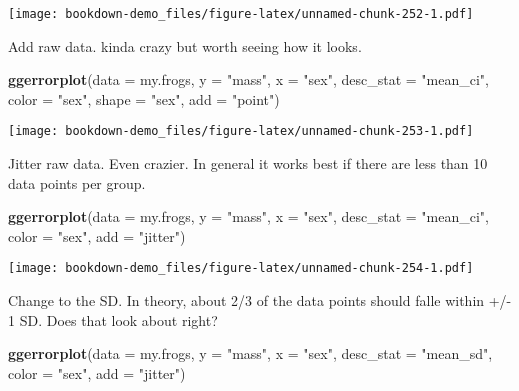 \documentclass[]{book}
\newenvironment{Shaded}{\begin{snugshade}}{\end{snugshade}}
\newcommand{\KeywordTok}[1]{\textcolor[rgb]{0.13,0.29,0.53}{\textbf{#1}}}
\newcommand{\DataTypeTok}[1]{\textcolor[rgb]{0.13,0.29,0.53}{#1}}
\newcommand{\StringTok}[1]{\textcolor[rgb]{0.31,0.60,0.02}{#1}}
\newcommand{\NormalTok}[1]{#1}
\theoremstyle{definition}
\theoremstyle{definition}
\theoremstyle{definition}
\theoremstyle{remark}
\begin{document}
\texttt{[image: bookdown-demo\_files/figure-latex/unnamed-chunk-252-1.pdf]}

Add raw data. kinda crazy but worth seeing how it looks.

\begin{Shaded}
\begin{Highlighting}[]
\KeywordTok{ggerrorplot}\NormalTok{(}\DataTypeTok{data =}\NormalTok{ my.frogs,}
          \DataTypeTok{y =} \StringTok{"mass"}\NormalTok{,}
          \DataTypeTok{x =} \StringTok{"sex"}\NormalTok{,}
          \DataTypeTok{desc_stat =} \StringTok{"mean_ci"}\NormalTok{,}
          \DataTypeTok{color =} \StringTok{"sex"}\NormalTok{,}
          \DataTypeTok{shape =} \StringTok{"sex"}\NormalTok{,}
          \DataTypeTok{add =} \StringTok{"point"}\NormalTok{)}
\end{Highlighting}
\end{Shaded}

\texttt{[image: bookdown-demo\_files/figure-latex/unnamed-chunk-253-1.pdf]}

Jitter raw data. Even crazier. In general it works best if there are
less than 10 data points per group.

\begin{Shaded}
\begin{Highlighting}[]
\KeywordTok{ggerrorplot}\NormalTok{(}\DataTypeTok{data =}\NormalTok{ my.frogs,}
          \DataTypeTok{y =} \StringTok{"mass"}\NormalTok{,}
          \DataTypeTok{x =} \StringTok{"sex"}\NormalTok{,}
          \DataTypeTok{desc_stat =} \StringTok{"mean_ci"}\NormalTok{,}
          \DataTypeTok{color =} \StringTok{"sex"}\NormalTok{,}
          \DataTypeTok{add =} \StringTok{"jitter"}\NormalTok{)}
\end{Highlighting}
\end{Shaded}

\texttt{[image: bookdown-demo\_files/figure-latex/unnamed-chunk-254-1.pdf]}

Change to the SD. In theory, about 2/3 of the data points should falle
within +/- 1 SD. Does that look about right?

\begin{Shaded}
\begin{Highlighting}[]
\KeywordTok{ggerrorplot}\NormalTok{(}\DataTypeTok{data =}\NormalTok{ my.frogs,}
          \DataTypeTok{y =} \StringTok{"mass"}\NormalTok{,}
          \DataTypeTok{x =} \StringTok{"sex"}\NormalTok{,}
          \DataTypeTok{desc_stat =} \StringTok{"mean_sd"}\NormalTok{,}
          \DataTypeTok{color =} \StringTok{"sex"}\NormalTok{,}
          \DataTypeTok{add =} \StringTok{"jitter"}\NormalTok{)}
\end{Highlighting}
\end{Shaded}
\end{document}

